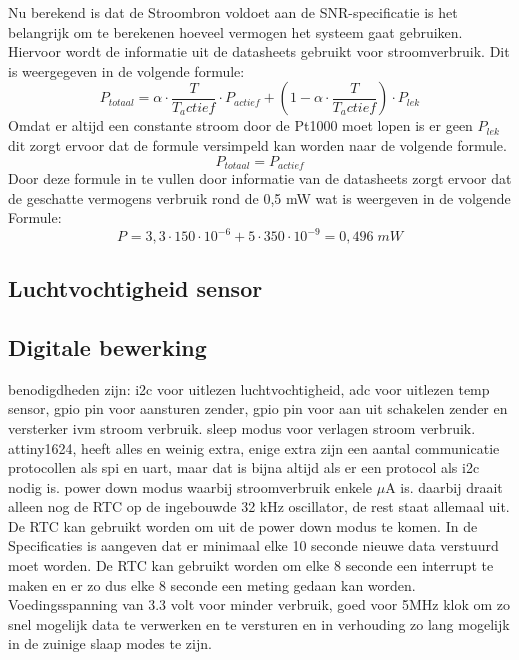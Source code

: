 Nu berekend is dat de Stroombron voldoet aan de SNR-specificatie is het belangrijk om te berekenen hoeveel vermogen het systeem gaat gebruiken. Hiervoor wordt de informatie uit de datasheets gebruikt voor stroomverbruik. Dit is weergegeven in de volgende formule:
\[
P_{totaal} = \alpha \cdot \frac{T}{T_actief} \cdot P_{actief} + (1-\alpha \cdot \frac{T}{T_actief}) \cdot P_{lek}
\]
Omdat er altijd een constante stroom door de Pt1000 moet lopen is er geen $P_{lek}$ dit zorgt ervoor dat de formule versimpeld kan worden naar de volgende formule.
\[
P_{totaal} = P_{actief}
\]
Door deze formule in te vullen door informatie van de datasheets \cite{LTC2055,Spannings_ref} zorgt ervoor dat de geschatte vermogens verbruik rond de 0,5 mW wat is weergeven in de volgende Formule:
\[
P_{\text{}} = 3,3 \cdot 150 \cdot 10^{-6} + 5 \cdot 350 \cdot 10^{-9} = 0,496 \; mW
\]

\subsection{Luchtvochtigheid sensor}


\subsection{Digitale bewerking}
benodigdheden zijn: i2c voor uitlezen luchtvochtigheid, adc voor uitlezen temp sensor, gpio pin voor aansturen zender, gpio pin voor aan uit schakelen zender en versterker ivm stroom verbruik. sleep modus voor verlagen stroom verbruik.
attiny1624, heeft alles en weinig extra, enige extra zijn een aantal communicatie protocollen als spi en uart, maar dat is bijna altijd als er een protocol als i2c nodig is.
power down modus waarbij stroomverbruik enkele $\mu$A is. daarbij draait alleen nog de RTC op de ingebouwde 32 kHz oscillator, de rest staat allemaal uit. De RTC kan gebruikt worden om uit de power down modus te komen. In de Specificaties is aangeven dat er minimaal elke 10 seconde nieuwe data verstuurd moet worden. De RTC kan gebruikt worden om elke 8 seconde een interrupt te maken en er zo dus elke 8 seconde een meting gedaan kan worden.
Voedingsspanning van 3.3 volt voor minder verbruik, goed voor 5MHz klok om zo snel mogelijk data te verwerken en te versturen en in verhouding zo lang mogelijk in de zuinige slaap modes te zijn. 



